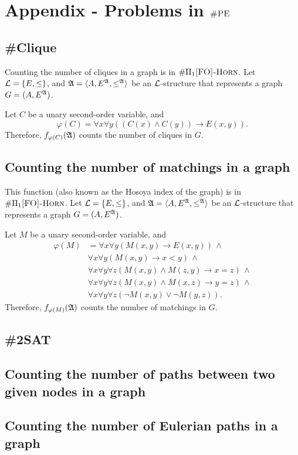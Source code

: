 \section{Appendix - Problems in $\textsc{\#PE}$}

\subsection{\#Clique}
Counting the number of cliques in a graph is in $\#\Pi_{1}\textsc{[FO]-Horn}$. Let ${\cal L} = \{E,\leq\}$, and ${\frak A} = \langle A, E^{{\frak A}}, \leq^{{\frak A}} \rangle$ be an ${\cal L}$-structure that represents a graph $G = (A,E^{{\frak A}})$.

Let $C$ be a unary second-order variable, and
\[
\varphi(C) = \forall x \forall y((C(x)\wedge C(y))\to E(x,y)).
\]
Therefore, $f_{\varphi(C)}({\frak A})$ counts the number of cliques in $G$.

\subsection{Counting the number of matchings in a graph}
This function (also known as the Hosoya index of the graph) is in $\#\Pi_{1}\textsc{[FO]-Horn}$. Let ${\cal L} = \{E,\leq\}$, and ${\frak A} = \langle A, E^{{\frak A}}, \leq^{{\frak A}} \rangle$ be an ${\cal L}$-structure that represents a graph $G = (A,E^{{\frak A}})$.

Let $M$ be a unary second-order variable, and
\begin{align*}
\varphi(M) &= \forall x \forall y (M(x,y)\to E(x,y))\,\wedge \\
& \forall x \forall y (M(x,y)\to x < y)\,\wedge \\
& \forall x \forall y \forall z(M(x,y)\wedge M(z,y) \to x = z)\,\wedge \\
& \forall x \forall y \forall z(M(x,y)\wedge M(x,z) \to y = z)\,\wedge \\
& \forall x \forall y \forall z(\neg M(x,y)\vee \neg M(y,z)).
\end{align*}
Therefore, $f_{\varphi(M)}({\frak A})$ counts the number of matchings in $G$.
\subsection{\#2SAT}

\subsection{Counting the number of paths between two given nodes in a graph}

\subsection{Counting the number of Eulerian paths in a graph}

